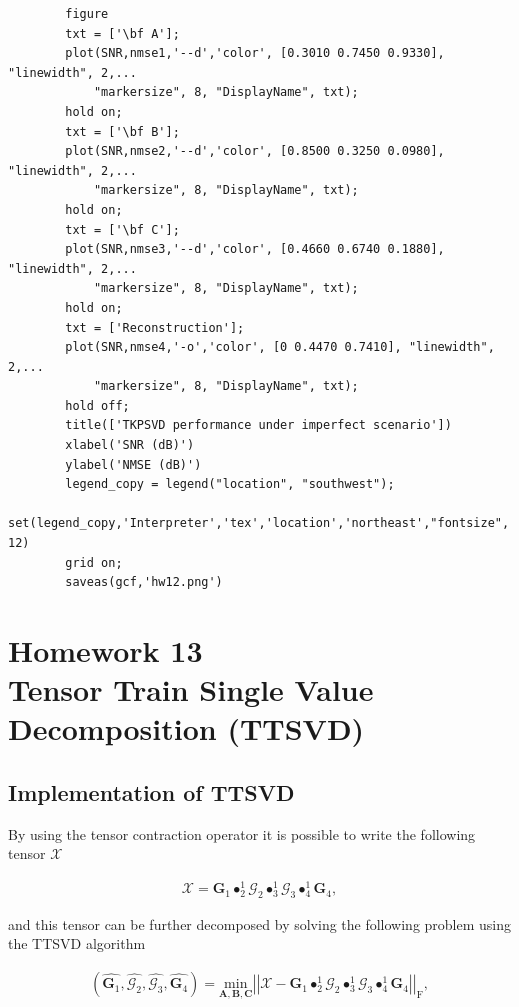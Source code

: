 \documentclass[a4paper,10pt]{article}
\begin{document}
\begin{verbatim}
        figure
        txt = ['\bf A'];
        plot(SNR,nmse1,'--d','color', [0.3010 0.7450 0.9330], "linewidth", 2,...
            "markersize", 8, "DisplayName", txt);
        hold on;
        txt = ['\bf B'];
        plot(SNR,nmse2,'--d','color', [0.8500 0.3250 0.0980], "linewidth", 2,...
            "markersize", 8, "DisplayName", txt);
        hold on;
        txt = ['\bf C'];
        plot(SNR,nmse3,'--d','color', [0.4660 0.6740 0.1880], "linewidth", 2,...
            "markersize", 8, "DisplayName", txt);
        hold on;
        txt = ['Reconstruction'];
        plot(SNR,nmse4,'-o','color', [0 0.4470 0.7410], "linewidth", 2,...
            "markersize", 8, "DisplayName", txt);
        hold off;
        title(['TKPSVD performance under imperfect scenario'])
        xlabel('SNR (dB)')
        ylabel('NMSE (dB)')
        legend_copy = legend("location", "southwest");
        set(legend_copy,'Interpreter','tex','location','northeast',"fontsize", 12)
        grid on;
        saveas(gcf,'hw12.png')
    \end{verbatim}
    
\newpage
\section*{Homework 13 \\ Tensor Train Single Value Decomposition (TTSVD)}

    \subsection*{Implementation of TTSVD}
        
    By using the tensor contraction operator it is possible to write the following tensor $\mathcal{X}$

    \begin{align}
        \mathcal{X} = \boldsymbol{G}_{1} \bullet^{1}_{2} \mathcal{G}_{2} \bullet^{1}_{3} \mathcal{G}_{3} \bullet^{1}_{4} \boldsymbol{G}_{4},
    \end{align}

    and this tensor can be further decomposed by solving the following problem using the TTSVD algorithm

    \begin{align}
        \left(\hat{\boldsymbol{G}_{1}}, \hat{\mathcal{G}_{2}}, \hat{\mathcal{G}_{3}}, \hat{\boldsymbol{G}_{4}}\right) = \underset{\boldsymbol{A}, \boldsymbol{B}, \boldsymbol{C}}{\text{min}} \left| \left| \mathcal{X} - \boldsymbol{G}_{1} \bullet^{1}_{2} \mathcal{G}_{2} \bullet^{1}_{3} \mathcal{G}_{3} \bullet^{1}_{4} \boldsymbol{G}_{4} \right| \right|_{\text{F}},
    \end{align}
\end{document}
